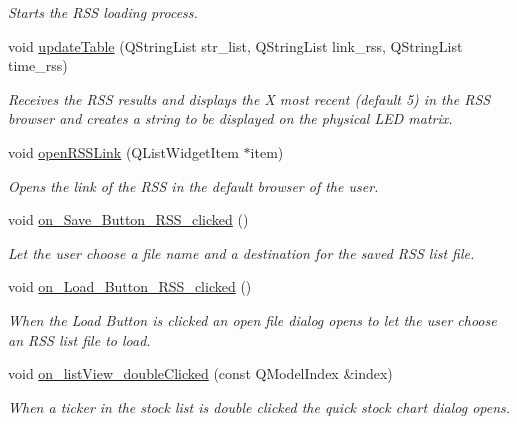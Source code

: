 \begin{DoxyCompactItemize}
\begin{DoxyCompactList}\small\item\em Starts the R\+S\+S loading process. \end{DoxyCompactList}\item 
void \hyperlink{class_t_k_r_t_a_p_adec88a87264a22575064eb9c03eecfc7}{update\+Table} (Q\+String\+List str\+\_\+list, Q\+String\+List link\+\_\+rss, Q\+String\+List time\+\_\+rss)
\begin{DoxyCompactList}\small\item\em Receives the R\+S\+S results and displays the X most recent (default 5) in the R\+S\+S browser and creates a string to be displayed on the physical L\+E\+D matrix. \end{DoxyCompactList}\item 
void \hyperlink{class_t_k_r_t_a_p_a0dd268ebec54f111eef86da401f459a1}{open\+R\+S\+S\+Link} (Q\+List\+Widget\+Item $\ast$item)
\begin{DoxyCompactList}\small\item\em Opens the link of the R\+S\+S in the default browser of the user. \end{DoxyCompactList}\item 
\hypertarget{class_t_k_r_t_a_p_afbf6f2c24b041c0834c72d96452638bd}{void \hyperlink{class_t_k_r_t_a_p_afbf6f2c24b041c0834c72d96452638bd}{on\+\_\+\+Save\+\_\+\+Button\+\_\+\+R\+S\+S\+\_\+clicked} ()}\label{class_t_k_r_t_a_p_afbf6f2c24b041c0834c72d96452638bd}

\begin{DoxyCompactList}\small\item\em Let the user choose a file name and a destination for the saved R\+S\+S list file. \end{DoxyCompactList}\item 
\hypertarget{class_t_k_r_t_a_p_ac99a293ac859f4b8e9f3b539c0fe1889}{void \hyperlink{class_t_k_r_t_a_p_ac99a293ac859f4b8e9f3b539c0fe1889}{on\+\_\+\+Load\+\_\+\+Button\+\_\+\+R\+S\+S\+\_\+clicked} ()}\label{class_t_k_r_t_a_p_ac99a293ac859f4b8e9f3b539c0fe1889}

\begin{DoxyCompactList}\small\item\em When the Load Button is clicked an open file dialog opens to let the user choose an R\+S\+S list file to load. \end{DoxyCompactList}\item 
\hypertarget{class_t_k_r_t_a_p_a54b652ca1f240769140b278e0e4a4ddb}{void \hyperlink{class_t_k_r_t_a_p_a54b652ca1f240769140b278e0e4a4ddb}{on\+\_\+list\+View\+\_\+double\+Clicked} (const Q\+Model\+Index \&index)}\label{class_t_k_r_t_a_p_a54b652ca1f240769140b278e0e4a4ddb}

\begin{DoxyCompactList}\small\item\em When a ticker in the stock list is double clicked the quick stock chart dialog opens. \end{DoxyCompactList}\end{DoxyCompactItemize}
